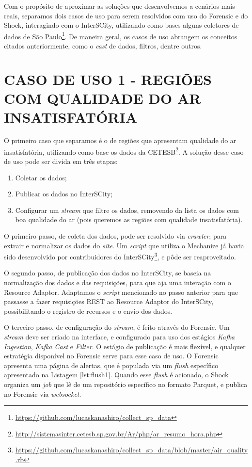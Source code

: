 Com o propósito de aproximar as soluções que desenvolvemos a cenários mais reais,
separamos dois casos de uso para serem resolvidos com uso do Forensic e do
Shock, interagindo com o InterSCity, utilizando como bases alguns coletores de
dados de São
Paulo\footnote{\url{https://github.com/lucaskanashiro/collect_sp_data}}. De
maneira geral, os casos de uso abrangem os conceitos citados anteriormente,
como o \textit{cast} de dados, filtros, dentre outros.

\section{CASO DE USO 1 - REGIÕES COM QUALIDADE DO AR INSATISFATÓRIA}

O primeiro caso que separamos é o de regiões que apresentam qualidade do ar
insatisfatória, utilizando como base os dados da
CETESB\footnote{\url{http://sistemasinter.cetesb.sp.gov.br/Ar/php/ar_resumo_hora.php}}.
A solução desse caso de uso pode ser divida em três etapas:
\begin{enumerate}
    \item Coletar os dados;
    \item Publicar os dados no InterSCity;
    \item Configurar um \textit{stream} que filtre os dados, removendo
        da lista os dados com boa qualidade do ar (pois queremos as regiões
        com qualidade insatisfatória).
\end{enumerate}

O primeiro passo, de coleta dos dados, pode ser resolvido via \textit{crawler},
para extrair e normalizar os dados do \textit{site}. Um \textit{script} que
utiliza o Mechanize já havia sido desenvolvido por contribuidores do
InterSCity\footnote{\url{https://github.com/lucaskanashiro/collect_sp_data/blob/master/air_quality.rb}},
e pôde ser reaproveitado.

O segundo passo, de publicação dos dados no InterSCity, se baseia na
normalização dos dados e das requisições, para que aja uma interação com o
Resource Adaptor. Adaptamos o \textit{script} mencionado no passo anterior
para que passasse a fazer requisições REST ao Resource Adaptor do InterSCity,
possibilitando o registro de recursos e o envio dos dados.

O terceiro passo, de configuração do \textit{stream}, é feito através do Forensic.
Um \textit{stream} deve ser criado na interface, e configurado para uso dos
estágios \textit{Kafka Ingestion}, \textit{Kafka Cast} e \textit{Filter}.
O estágio de publicação é mais flexível, e qualquer
estratégia disponível no Forensic serve para esse caso de uso. O Forensic
apresenta uma página de alertas, que é populada via um \textit{flush}
específico apresentado na Listagem \ref{lst:flush1}. Quando esse
\textit{flush} é acionado, o Shock organiza um \textit{job}
que lê de um repositório específico no formato Parquet, e publica no Forensic
via \textit{websocket}.

